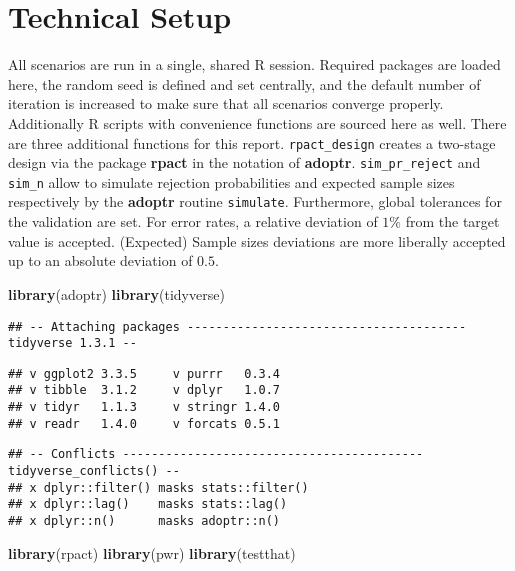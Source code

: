 \documentclass[
]{book}
\newenvironment{Shaded}{\begin{snugshade}}{\end{snugshade}}
\newcommand{\KeywordTok}[1]{\textcolor[rgb]{0.13,0.29,0.53}{\textbf{#1}}}
\newcommand{\NormalTok}[1]{#1}
\begin{document}
\hypertarget{technical-setup}{%
\section{Technical Setup}\label{technical-setup}}

All scenarios are run in a single, shared R session.
Required packages are loaded here,
the random seed is defined and set centrally, and the default number
of iteration is increased to make sure that all scenarios
converge properly.
Additionally R scripts with convenience functions are sourced here as well.
There are three additional functions for this report.
\texttt{rpact\_design} creates a two-stage design via the package \textbf{rpact} \citep{R-rpact}
in the notation of \textbf{adoptr}.
\texttt{sim\_pr\_reject} and \texttt{sim\_n} allow to simulate rejection probabilities
and expected sample sizes respectively by the \textbf{adoptr} routine \texttt{simulate}.
Furthermore, global tolerances for the validation are set.
For error rates, a relative deviation of \(1\%\) from the target value is
accepted.
(Expected) Sample sizes deviations are more liberally accepted up to an
absolute deviation of \(0.5\).

\begin{Shaded}
\begin{Highlighting}[]
\KeywordTok{library}\NormalTok{(adoptr)}
\KeywordTok{library}\NormalTok{(tidyverse)}
\end{Highlighting}
\end{Shaded}

\begin{verbatim}
## -- Attaching packages --------------------------------------- tidyverse 1.3.1 --
\end{verbatim}

\begin{verbatim}
## v ggplot2 3.3.5     v purrr   0.3.4
## v tibble  3.1.2     v dplyr   1.0.7
## v tidyr   1.1.3     v stringr 1.4.0
## v readr   1.4.0     v forcats 0.5.1
\end{verbatim}

\begin{verbatim}
## -- Conflicts ------------------------------------------ tidyverse_conflicts() --
## x dplyr::filter() masks stats::filter()
## x dplyr::lag()    masks stats::lag()
## x dplyr::n()      masks adoptr::n()
\end{verbatim}

\begin{Shaded}
\begin{Highlighting}[]
\KeywordTok{library}\NormalTok{(rpact)}
\KeywordTok{library}\NormalTok{(pwr)}
\KeywordTok{library}\NormalTok{(testthat)}
\end{Highlighting}
\end{Shaded}
\end{document}
